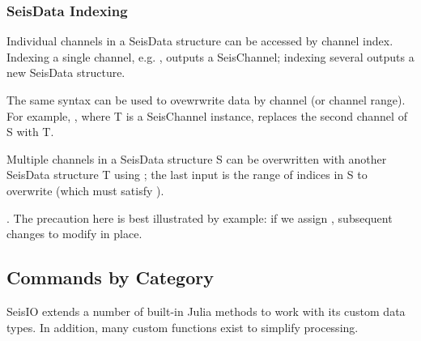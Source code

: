\documentclass[letterpaper,11pt,english]{sphinxmanual}
\begin{document}
%
\begin{sphinxVerbatim}[commandchars=\\\{\}]
   
   
    
\end{sphinxVerbatim}


\subsubsection{SeisData Indexing}
\label{\detokenize{src/seisdata:seisdata-indexing}}
Individual channels in a SeisData structure can be accessed by channel index. Indexing a single channel, e.g. , outputs a SeisChannel; indexing several outputs a new SeisData structure.

The same syntax can be used to ovewrwrite data by channel (or channel range). For example, , where T is a SeisChannel instance, replaces the second channel of S with T.

Multiple channels in a SeisData structure S can be overwritten with another SeisData structure T using ; the last input is the range of indices in S to overwrite (which must satisfy ).

. The precaution here is best illustrated by example: if we assign , subsequent changes to  modify  in place.


\subsection{Commands by Category}
\label{\detokenize{src/seisdata:commands-by-category}}
SeisIO extends a number of built-in Julia methods to work with its custom data types. In addition, many custom functions exist to simplify processing.
\end{document}
